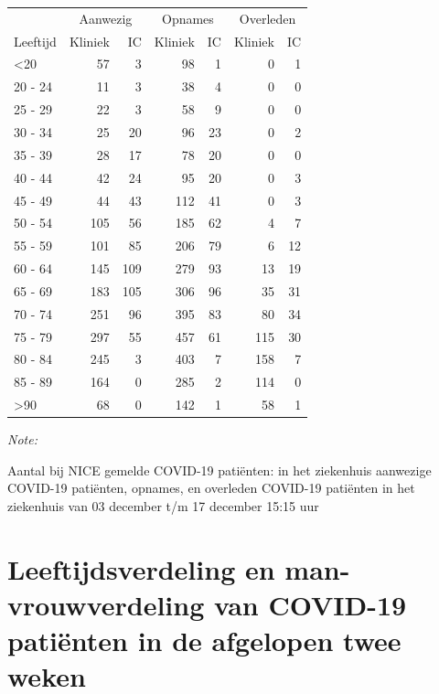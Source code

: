 \documentclass[
  english,
  man,floatsintext]{apa6}
\begin{document}
\begin{table}
\centering\begingroup\fontsize{10}{12}\selectfont

\begin{threeparttable}
\begin{tabular}{lrrrrrr}
\toprule
\multicolumn{1}{c}{ } & \multicolumn{2}{c}{Aanwezig} & \multicolumn{2}{c}{Opnames} & \multicolumn{2}{c}{Overleden} \\
\cmidrule(l{3pt}r{3pt}){2-3} \cmidrule(l{3pt}r{3pt}){4-5} \cmidrule(l{3pt}r{3pt}){6-7}
Leeftijd & Kliniek & IC & Kliniek & IC & Kliniek & IC\\
\midrule
<20 & 57 & 3 & 98 & 1 & 0 & 1\\
20 - 24 & 11 & 3 & 38 & 4 & 0 & 0\\
25 - 29 & 22 & 3 & 58 & 9 & 0 & 0\\
30 - 34 & 25 & 20 & 96 & 23 & 0 & 2\\
35 - 39 & 28 & 17 & 78 & 20 & 0 & 0\\
40 - 44 & 42 & 24 & 95 & 20 & 0 & 3\\
45 - 49 & 44 & 43 & 112 & 41 & 0 & 3\\
50 - 54 & 105 & 56 & 185 & 62 & 4 & 7\\
55 - 59 & 101 & 85 & 206 & 79 & 6 & 12\\
60 - 64 & 145 & 109 & 279 & 93 & 13 & 19\\
65 - 69 & 183 & 105 & 306 & 96 & 35 & 31\\
70 - 74 & 251 & 96 & 395 & 83 & 80 & 34\\
75 - 79 & 297 & 55 & 457 & 61 & 115 & 30\\
80 - 84 & 245 & 3 & 403 & 7 & 158 & 7\\
85 - 89 & 164 & 0 & 285 & 2 & 114 & 0\\
>90 & 68 & 0 & 142 & 1 & 58 & 1\\
\bottomrule
\end{tabular}
\begin{tablenotes}
\item \textit{Note: } 
\item Aantal bij NICE gemelde COVID-19 patiënten: in het ziekenhuis aanwezige COVID-19 patiënten, opnames, en overleden COVID-19 patiënten in het ziekenhuis van 03 december t/m 17 december 15:15 uur
\end{tablenotes}
\end{threeparttable}
\endgroup{}
\end{table}

\newpage

\hypertarget{leeftijdsverdeling-en-man-vrouwverdeling-van-covid-19-patiuxebnten-in-de-afgelopen-twee-weken}{%
\section{Leeftijdsverdeling en man-vrouwverdeling van COVID-19 patiënten in de afgelopen twee weken}\label{leeftijdsverdeling-en-man-vrouwverdeling-van-covid-19-patiuxebnten-in-de-afgelopen-twee-weken}}
\end{document}
